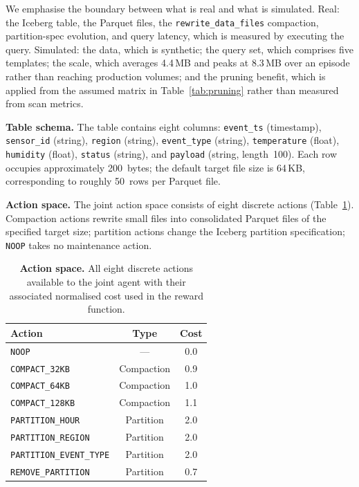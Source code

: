 \documentclass[fleqn,10pt]{wlscirep}
\newcommand{\noop}{\texttt{NOOP}}
\begin{document}
We emphasise the boundary between what is real and what is simulated.
Real: the Iceberg table, the Parquet files, the
\texttt{rewrite\_data\_files} compaction, partition-spec evolution, and
query latency, which is measured by executing the query. Simulated: the
data, which is synthetic; the query set, which comprises five templates;
the scale, which averages 4.4\,MB and peaks at 8.3\,MB over an episode
rather than reaching production volumes; and
the pruning benefit, which is applied from the assumed matrix in
Table~\ref{tab:pruning} rather than measured from scan metrics.

\textbf{Table schema.}
The table contains eight columns: \texttt{event\_ts} (timestamp),
\texttt{sensor\_id} (string), \texttt{region} (string),
\texttt{event\_type} (string), \texttt{temperature} (float),
\texttt{humidity} (float), \texttt{status} (string), and
\texttt{payload} (string, length~100). Each row occupies
approximately 200~bytes; the default target file size is 64\,KB,
corresponding to roughly 50~rows per Parquet file.

\textbf{Action space.}
The joint action space consists of eight discrete actions
(Table~\ref{tab:actions}). Compaction actions rewrite small files into
consolidated Parquet files of the specified target size; partition
actions change the Iceberg partition specification; \noop{} takes no
maintenance action.

\begin{table}[!htbp]
\centering
\begin{tabular}{lcc}
\toprule
\textbf{Action} & \textbf{Type} & \textbf{Cost} \\
\midrule
\texttt{NOOP}                   & ---        & 0.0 \\
\texttt{COMPACT\_32KB}          & Compaction & 0.9 \\
\texttt{COMPACT\_64KB}          & Compaction & 1.0 \\
\texttt{COMPACT\_128KB}         & Compaction & 1.1 \\
\texttt{PARTITION\_HOUR}        & Partition  & 2.0 \\
\texttt{PARTITION\_REGION}      & Partition  & 2.0 \\
\texttt{PARTITION\_EVENT\_TYPE} & Partition  & 2.0 \\
\texttt{REMOVE\_PARTITION}      & Partition  & 0.7 \\
\bottomrule
\end{tabular}
\caption{\label{tab:actions}\textbf{Action space.}
  All eight discrete actions available to the joint agent with their
  associated normalised cost used in the reward function.}
\end{table}
\end{document}
